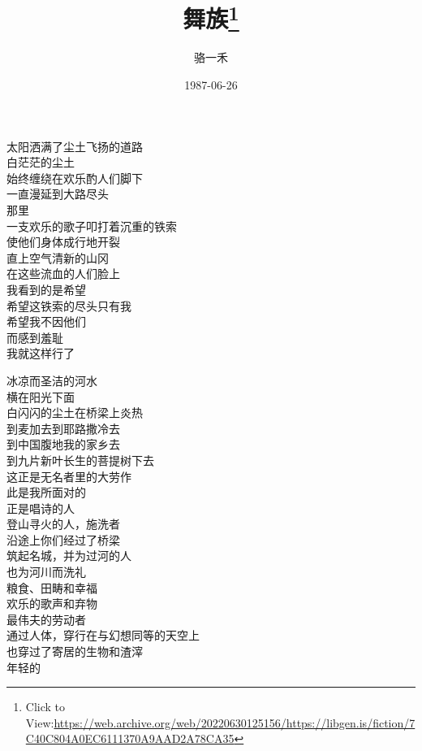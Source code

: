 \documentclass{article}
\title{舞族\footnote{Click to View:\url{https://web.archive.org/web/20220630125156/https://libgen.is/fiction/7C40C804A0EC6111370A9AAD2A78CA35}}}
\author{骆一禾}
\date{1987-06-26}
\begin{document}

\maketitle

\setlength\parindent{0pt}


\Large

﻿太阳洒满了尘土飞扬的道路\\
白茫茫的尘土\\
始终缠绕在欢乐酌人们脚下
\\
一直漫延到大路尽头 \\ 


那里\\
一支欢乐的歌子叩打着沉重的铁索\\
使他们身体成行地开裂\\
直上空气清新的山冈\\
在这些流血的人们脸上\\
我看到的是希望\\
希望这铁索的尽头只有我\\
希望我不因他们\\
而感到羞耻\\
我就这样行了\\
\newpage

冰凉而圣洁的河水\\
横在阳光下面\\
白闪闪的尘土在桥梁上炎热\\
到麦加去到耶路撒冷去\\
到中国腹地我的家乡去\\
到九片新叶长生的菩提树下去\\
这正是无名者里的大劳作\\
此是我所面对的\\
正是唱诗的人
\\
登山寻火的人，施洗者 \\ 


沿途上你们经过了桥梁\\
筑起名城，并为过河的人\\
也为河川而洗礼\\
粮食、田畴和幸福\\
欢乐的歌声和弃物\\
最伟夫的劳动者\\
通过人体，穿行在与幻想同等的天空上
\\
也穿过了寄居的生物和渣滓 \\ 


年轻的\\
\newpage
\end{document}
